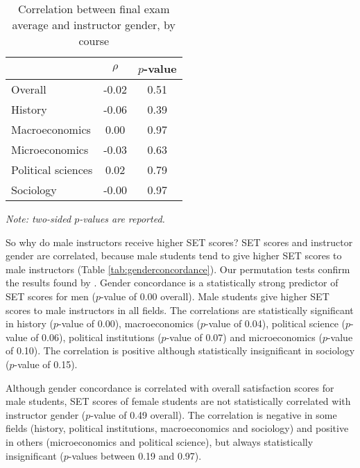 \documentclass[12pt]{article}
\begin{document}
\begin{table}[htbp]
  \centering
  \footnotesize 
  \caption{Correlation between final exam average and instructor gender, by course}
    \begin{tabular}{lcc}
    \toprule 
                     & $\rho$  & $p$-value    \\
   \midrule
    Overall &            -0.02       & 0.51      \\
    History &            -0.06       & 0.39      \\
    Macroeconomics &      0.00       & 0.97      \\
    Microeconomics &     -0.03       & 0.63      \\
    Political sciences &  0.02       & 0.79      \\
    Sociology &          -0.00       & 0.97      \\
    \bottomrule
    \end{tabular}%
 \label{tab:genderfinal}%
 
  \textit{Note: two-sided $p$-values are reported.}
\end{table}%
\normalsize



So why do male instructors receive higher SET scores? SET scores and instructor gender are correlated, because male students tend to give higher SET scores to male instructors (Table \ref{tab:genderconcordance}). Our permutation tests confirm the results found by \citet{Boring2015}. Gender concordance is a statistically strong predictor of SET scores for men ($p$-value of 0.00 overall). Male students give higher SET scores to male instructors in all fields. The correlations are statistically significant in history ($p$-value of 0.00), macroeconomics ($p$-value of 0.04), political science ($p$-value of 0.06), political institutions ($p$-value of 0.07) and  microeconomics ($p$-value of 0.10). The correlation is positive although statistically insignificant in sociology ($p$-value of 0.15). 

Although gender concordance is correlated with overall satisfaction scores for male students, SET scores of female students are not statistically correlated with instructor gender ($p$-value of 0.49 overall). The correlation is negative in some fields (history, political institutions, macroeconomics and sociology) and positive in others (microeconomics and political science), but always statistically insignificant ($p$-values between 0.19 and 0.97).
\end{document}
